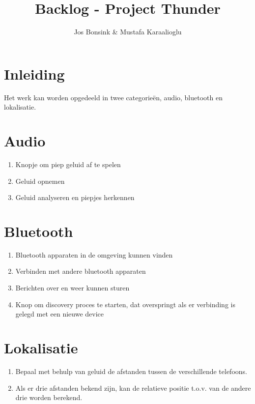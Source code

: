 \documentclass[12pt]{article}
\author{Jos Bonsink \& Mustafa Karaalioglu}
\begin{document}
\title{Backlog - Project Thunder}
\maketitle

\section*{Inleiding}
Het werk kan worden opgedeeld in twee categorie\"en, audio, bluetooth en lokalisatie.

\section*{Audio}
\begin{enumerate}
\item Knopje om piep geluid af te spelen
\item Geluid opnemen
\item Geluid analyseren en piepjes herkennen
\end{enumerate}

\section*{Bluetooth}
\begin{enumerate}
\item Bluetooth apparaten in de omgeving kunnen vinden
\item Verbinden met andere bluetooth apparaten
\item Berichten over en weer kunnen sturen
\item Knop om discovery proces te starten, dat overspringt als er verbinding is gelegd met een nieuwe device
\end{enumerate}

\section*{Lokalisatie}
\begin{enumerate}
\item Bepaal met behulp van geluid de afstanden tussen de verschillende telefoons.
\item Als er drie afstanden bekend zijn, kan de relatieve positie t.o.v. van de andere drie worden berekend.
\end{enumerate}
\end{document}
